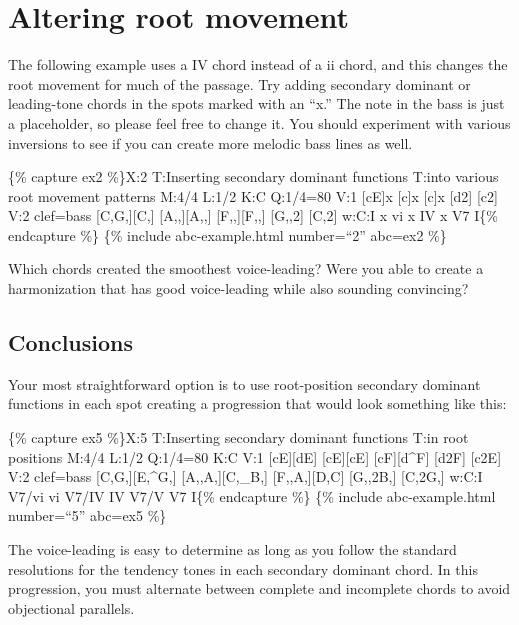 \documentclass{book}
\begin{document}
\hypertarget{altering-root-movement}{%
\section{Altering root movement}\label{altering-root-movement}}

The following example uses a IV chord instead of a ii chord, and this changes
the root movement for much of the passage. Try adding secondary dominant or
leading-tone chords in the spots marked with an ``x.'' The note in the bass is
just a placeholder, so please feel free to change it. You should experiment
with various inversions to see if you can create more melodic bass lines as
well.

\{\% capture ex2 \%\}X:2 T:Inserting secondary dominant functions T:into
various root movement patterns M:4/4 L:1/2 K:C Q:1/4=80 V:1
{[}cE{]}x\textbar{} {[}c{]}x\textbar{} {[}c{]}x\textbar{} {[}d2{]}\textbar{}
{[}c2{]}\textbar{]} V:2 clef=bass {[}C,G,{]}{[}C,{]}\textbar{}
{[}A,,{]}{[}A,,{]}\textbar{} {[}F,,{]}{[}F,,{]}\textbar{} {[}G,,2{]}\textbar{}
{[}C,2{]}\textbar{]} w:C:I x vi x IV x V7 I\{\% endcapture \%\} \{\% include
abc-example.html number=``2'' abc=ex2 \%\}

Which chords created the smoothest voice-leading? Were you able to create a
harmonization that has good voice-leading while also sounding convincing?

\hypertarget{conclusions-12}{%
\subsection{Conclusions}\label{conclusions-12}}

Your most straightforward option is to use root-position secondary dominant
functions in each spot creating a progression that would look something like
this:

\{\% capture ex5 \%\}X:5 T:Inserting secondary dominant functions T:in root
positions M:4/4 L:1/2 Q:1/4=80 K:C V:1 {[}cE{]}{[}dE{]}\textbar{}
{[}cE{]}{[}cE{]}\textbar{} {[}cF{]}{[}d\^{}F{]}\textbar{} {[}d2F{]}\textbar{}
{[}c2E{]}\textbar{]} V:2 clef=bass {[}C,G,{]}{[}E,\^{}G,{]}\textbar{}
{[}A,,A,{]}{[}C,\_B,{]}\textbar{} {[}F,,A,{]}{[}D,C{]}\textbar{}
{[}G,,2B,{]}\textbar{} {[}C,2G,{]}\textbar{]} w:C:I V7/vi vi V7/IV IV V7/V V7
I\{\% endcapture \%\} \{\% include abc-example.html number=``5'' abc=ex5 \%\}

The voice-leading is easy to determine as long as you follow the standard
resolutions for the tendency tones in each secondary dominant chord. In this
progression, you must alternate between complete and incomplete chords to
avoid objectional parallels.
\end{document}
